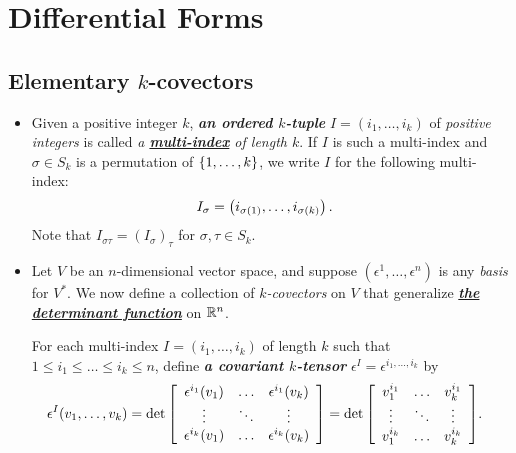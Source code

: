 \documentclass[11pt]{article}
\begin{document}
\section{Differential Forms}
\subsection{Elementary $k$-covectors}
\begin{itemize}
\item \begin{definition}
Given a positive integer $k$, \emph{\textbf{an ordered $k$-tuple}} $I=(i_1,\ldots, i_k)$ of \emph{positive integers} is called \emph{a \underline{\textbf{multi-index}} of length $k$}. If $I$ is such a multi-index and  $\sigma \in S_k$ is a permutation of $\left\{1,\ldots,k\right\}$, we write $I$ for the following multi-index:
\begin{align*}
I_{\sigma} &= \left(i_{\sigma(1)},\ldots, i_{\sigma(k)}\right).
\end{align*} Note that $I_{\sigma\tau}= (I_{\sigma})_{\tau}$ for $\sigma, \tau \in S_k$.
\end{definition}

\item \begin{definition}
Let $V$ be an $n$-dimensional vector space, and suppose $(\epsilon^1,\ldots, \epsilon^n)$ is any \emph{basis} for $V^{*}$. We now define a collection of \emph{$k$-covectors} on $V$ that generalize \underline{\emph{\textbf{the determinant function}}} on ${\mathbb R}^n$. 

For each multi-index $I=(i_1,\ldots, i_k)$ of length $k$ such that $1\le i_1\le \ldots \le i_k \le n$, define \emph{\textbf{a covariant $k$-tensor}} $\epsilon^I = \epsilon^{i_1,\ldots, i_k}$ by
\begin{align}
\epsilon^I(v_1, \ldots, v_k) &= \det{\left[\begin{array}{ccc}
\epsilon^{i_1}(v_1) & \ldots & \epsilon^{i_1}(v_k)\\
\vdots & \ddots & \vdots \\
\epsilon^{i_k}(v_1) & \ldots & \epsilon^{i_k}(v_k)
\end{array}\right]} = \det{\left[ \begin{array}{ccc}
v_1^{i_1} & \ldots & v_k^{i_1}\\
\vdots & \ddots & \vdots \\
v_1^{i_k} & \ldots & v_k^{i_k}
\end{array}  \right]}.   \label{eqn: elementary_alt_tensor}
\end{align} 


\end{definition}
\end{itemize}
\end{document}
